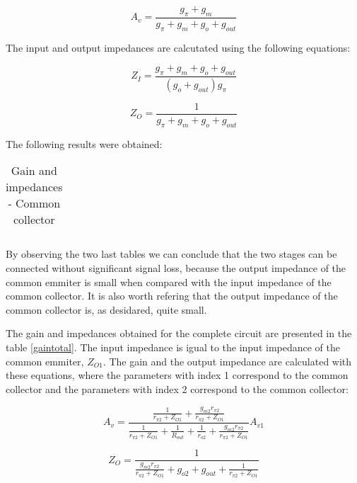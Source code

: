 \begin{equation}
        A_v = \frac{g_{\pi}+g_m}{g_{\pi}+g_m+g_o+g_{out}}
\end{equation}

The input and output impedances are calcutated using the following equations:

\begin{equation}
        Z_I = \frac{g_{\pi}+g_m+g_o+g_{out}}{(g_o+g_{out})g_{\pi}}
\end{equation}

\begin{equation}
        Z_O = \frac{1}{g_{\pi}+g_m+g_o+g_{out}}
\end{equation}

The following results were obtained:

\begin{table}[H]
  \centering
  \begin{tabular}{|c|c|}
    \hline
        
        \hline
  \end{tabular}
  \caption{Gain and impedances - Common collector}
  \label{gaincollector}
\end{table}

By observing the two last tables we can conclude that the two stages can be connected without significant signal loss, because the output impedance of the common emmiter is small when compared with the input impedance of the common collector. It is also worth refering that the output impedance of the common collector is, as desidared, quite small.

The gain and impedances obtained for the complete circuit are presented in the table \ref{gaintotal}. The input impedance is igual to the input impedance of the common emmiter, $Z_{O1}$. The gain and the output impedance are calculated with these equations, where the parameters with index 1 correspond to the common collector and the parameters with index 2 correspond to the common collector:

\begin{equation}
        A_v = \frac{\frac{1}{r_{\pi2}+Z_{O1}}+\frac{g_{m2}r_{\pi2}}{r_{\pi2}+Z_{O1}}}{\frac{1}{r_{\pi2}+Z_{O1}}+\frac{1}{R_{out}}+\frac{1}{r_{o2}}+\frac{g_{m2}r_{\pi2}}{r_{\pi2}+Z_{O1}}} A_{v1}
\end{equation}

\begin{equation}
        Z_O = \frac{1}{\frac{g_{m2}r_{\pi2}}{r_{\pi2}+Z_{O1}}+g_{o2}+g_{out}+\frac{1}{r_{\pi2}+Z_{O1}}}
\end{equation}

